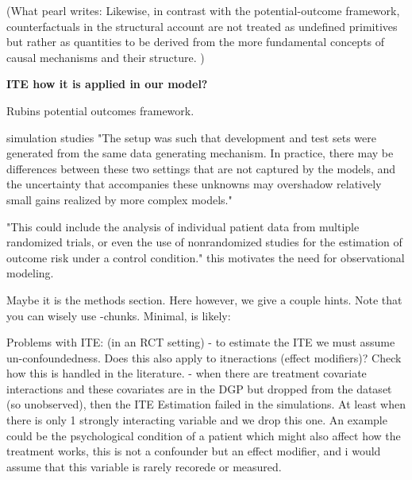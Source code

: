 (What pearl writes:  Likewise, in contrast with the potential-outcome framework, counterfactuals in the structural account are not treated as undefined primitives but rather as quantities to be derived from the more fundamental concepts of causal mechanisms and their structure. )


\textbf{ITE how it is applied in our model?}


Rubins potential outcomes framework.


simulation studies
 "The setup was such that development and test sets were generated from the same data generating mechanism. In practice, there may be differences between these two settings that are not captured by the models, and the uncertainty that accompanies these unknowns may overshadow relatively small gains realized by more complex models."
 
 "This could include the analysis of individual patient data from multiple randomized trials, or even the use of nonrandomized studies for the estimation of outcome risk under a control condition." this motivates the need for observational modeling.


Maybe it is the methods section. Here however, we give a couple hints.
Note that you can wisely use -chunks. Minimal, is likely:



Problems with ITE: (in an RCT setting)
- to estimate the ITE we must assume un-confoundedness. Does this also apply to itneractions (effect modifiers)? Check how this is handled in the literature.
- when there are treatment covariate interactions and these covariates are in the DGP but dropped from the dataset (so unobserved), then the ITE Estimation failed in the simulations. At least when there is only 1 strongly interacting variable and we drop this one. An example could be the psychological condition of a patient which might also affect how the treatment works, this is not a confounder but an effect modifier, and i would assume that this variable is rarely recorede or measured.

